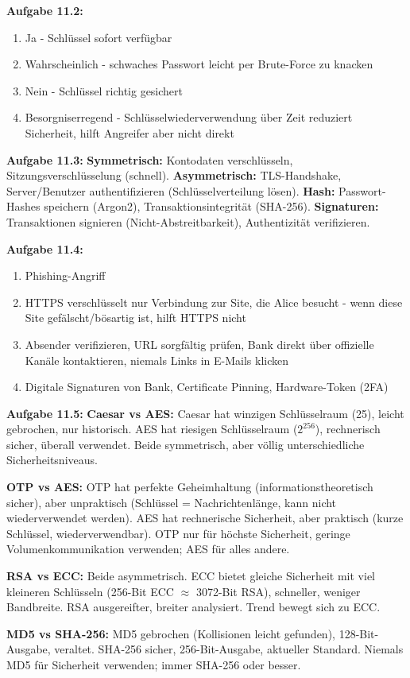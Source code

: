 \documentclass[11pt,a4paper]{report}
\begin{document}
\textbf{Aufgabe 11.2:}
\begin{enumerate}[label=\alph*)]
    \item Ja - Schlüssel sofort verfügbar
    \item Wahrscheinlich - schwaches Passwort leicht per Brute-Force zu knacken
    \item Nein - Schlüssel richtig gesichert
    \item Besorgniserregend - Schlüsselwiederverwendung über Zeit reduziert Sicherheit, hilft Angreifer aber nicht direkt
\end{enumerate}

\textbf{Aufgabe 11.3:}
\textbf{Symmetrisch:} Kontodaten verschlüsseln, Sitzungsverschlüsselung (schnell). \textbf{Asymmetrisch:} TLS-Handshake, Server/Benutzer authentifizieren (Schlüsselverteilung lösen). \textbf{Hash:} Passwort-Hashes speichern (Argon2), Transaktionsintegrität (SHA-256). \textbf{Signaturen:} Transaktionen signieren (Nicht-Abstreitbarkeit), Authentizität verifizieren.

\textbf{Aufgabe 11.4:}
\begin{enumerate}[label=\alph*)]
    \item Phishing-Angriff
    \item HTTPS verschlüsselt nur Verbindung zur Site, die Alice besucht - wenn diese Site gefälscht/bösartig ist, hilft HTTPS nicht
    \item Absender verifizieren, URL sorgfältig prüfen, Bank direkt über offizielle Kanäle kontaktieren, niemals Links in E-Mails klicken
    \item Digitale Signaturen von Bank, Certificate Pinning, Hardware-Token (2FA)
\end{enumerate}

\textbf{Aufgabe 11.5:}
\textbf{Caesar vs AES:} Caesar hat winzigen Schlüsselraum (25), leicht gebrochen, nur historisch. AES hat riesigen Schlüsselraum ($2^{256}$), rechnerisch sicher, überall verwendet. Beide symmetrisch, aber völlig unterschiedliche Sicherheitsniveaus.

\textbf{OTP vs AES:} OTP hat perfekte Geheimhaltung (informationstheoretisch sicher), aber unpraktisch (Schlüssel = Nachrichtenlänge, kann nicht wiederverwendet werden). AES hat rechnerische Sicherheit, aber praktisch (kurze Schlüssel, wiederverwendbar). OTP nur für höchste Sicherheit, geringe Volumenkommunikation verwenden; AES für alles andere.

\textbf{RSA vs ECC:} Beide asymmetrisch. ECC bietet gleiche Sicherheit mit viel kleineren Schlüsseln (256-Bit ECC $\approx$ 3072-Bit RSA), schneller, weniger Bandbreite. RSA ausgereifter, breiter analysiert. Trend bewegt sich zu ECC.

\textbf{MD5 vs SHA-256:} MD5 gebrochen (Kollisionen leicht gefunden), 128-Bit-Ausgabe, veraltet. SHA-256 sicher, 256-Bit-Ausgabe, aktueller Standard. Niemals MD5 für Sicherheit verwenden; immer SHA-256 oder besser.
\end{document}
